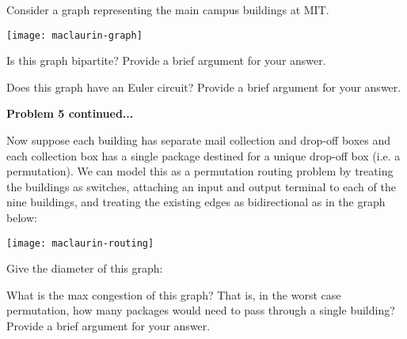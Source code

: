 \documentclass[12pt,oneside]{article}
\begin{document}
%
\begin{problem}{15}
Consider a graph representing the main campus buildings at MIT.

\vspace{18pt}
\centerline{\texttt{[image: maclaurin-graph]}}
\vspace{18pt}

\bparts

 Is this graph bipartite? Provide a brief argument for your answer.

 Does this graph have an Euler circuit? Provide a brief argument for your answer.

\newpage
\textbf{Problem 5 continued...}

Now suppose each building has separate mail collection and drop-off boxes and each collection box has a single package destined for a unique drop-off box (i.e. a permutation). We can model this as a permutation routing problem by treating the buildings as switches, attaching an input and output terminal to each of the nine buildings, and treating the existing edges as bidirectional as in the graph below:

\vspace{18pt}
\centerline{\texttt{[image: maclaurin-routing]}}
\vspace{18pt}

 Give the diameter of this graph:

 What is the max congestion of this graph? That is, in the worst case permutation, how many packages would need to pass through a single building?
Provide a brief argument for your answer.

\eparts
\end{problem}
\newpage
\end{document}
